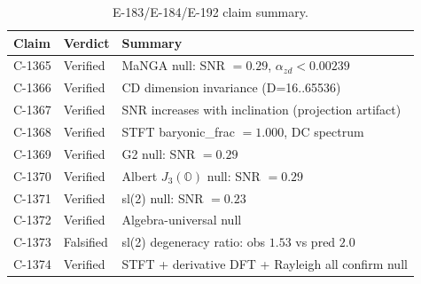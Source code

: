 \documentclass[aa]{aa}
\begin{document}
\begin{table}[h]
  \centering
  \caption{E-183/E-184/E-192 claim summary.}
  \begin{tabular}{lll}
    \toprule
    Claim & Verdict & Summary \\
    \midrule
    C-1365 & Verified & MaNGA null: SNR $= 0.29$, $\alpha_{zd} < 0.00239$ \\
    C-1366 & Verified & CD dimension invariance (D=16..65536) \\
    C-1367 & Verified & SNR increases with inclination (projection artifact) \\
    C-1368 & Verified & STFT baryonic\_frac $= 1.000$, DC spectrum \\
    C-1369 & Verified & G2 null: SNR $= 0.29$ \\
    C-1370 & Verified & Albert $J_3(\mathbb{O})$ null: SNR $= 0.29$ \\
    C-1371 & Verified & sl(2) null: SNR $= 0.23$ \\
    C-1372 & Verified & Algebra-universal null \\
    C-1373 & Falsified & sl(2) degeneracy ratio: obs $1.53$ vs pred $2.0$ \\
    C-1374 & Verified & STFT + derivative DFT + Rayleigh all confirm null \\
    \bottomrule
  \end{tabular}
  \label{tab:claims}
\end{table}


\end{document}
